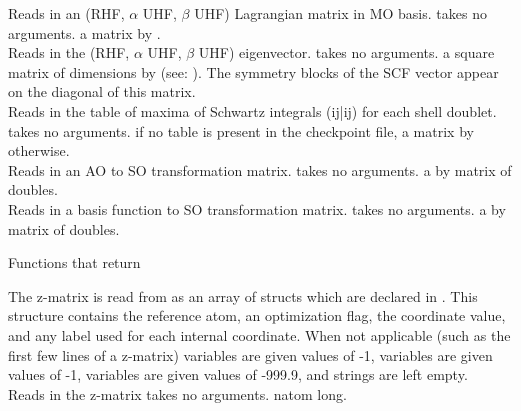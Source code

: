 {Reads in an (RHF, $\alpha$ UHF, $\beta$ UHF) Lagrangian matrix in MO basis.}
{takes no arguments.}
{a matrix  by .} \\
{Reads in the (RHF, $\alpha$ UHF, $\beta$ UHF) eigenvector.}
{takes no arguments.}
{a square matrix of dimensions 
by  (see: ).
The symmetry blocks of the SCF vector appear
on the diagonal of this matrix.} \\
{Reads in the table of maxima of Schwartz integrals (ij|ij)
for each shell doublet.}
{takes no arguments.}
{ if no table is present in the checkpoint file,
a matrix  by  otherwise.} \\
{Reads in an AO to SO transformation matrix.}
{takes no arguments.}
{a  by  matrix of doubles.} \\
{Reads in a basis function to SO transformation matrix.}
{takes no arguments.}
{a  by  matrix of doubles.}

\begin{center}
Functions that return  
\end{center}
{The z-matrix is read from  as an array of  structs
which are declared in .  This structure contains the reference atom,
an optimization flag, the coordinate value, and any label used for each internal 
coordinate.  When not applicable (such as the first few lines of a z-matrix) 
 variables are given values of -1,
 variables are given values of -1,  variables are
given values of -999.9, and  strings are left empty.} \\
{Reads in the z-matrix}
{takes no arguments.}
{  natom long.} 
